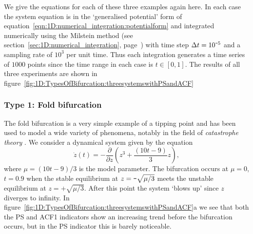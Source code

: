 {{	We give the equations for each of these three examples again here. In each case the system equation is in the `generalised potential' form of equation~\ref{eqn:1D:numerical_integration:potentialform} and integrated numerically using the Milstein method (see section~\ref{sec:1D:numerical_integration}, page~\pageref{sec:1D:numerical_integration}) with time step $\Delta t = 10^{\textup{\texttt{-}} 5}$ and a sampling rate of $10^3$ per unit time. Thus each integration generates a time series of $1000$ points since the time range in each case is $t\in [0,1]$. The results of all three experiments are shown in figure~\ref{fig:1D:TypesOfBifurcation:threesystemswithPSandACF}
	
	\subsubsection{Type 1: Fold bifurcation}
	The fold bifurcation is a very simple example of a tipping point and has been used to model a wide variety of phenomena, notably in the field of \emph{catastrophe theory} \citep{zeeman1977catastrophe, arnold1999bifurcation}. We consider a dynamical system given by the equation
	\begin{equation}
	\label{eqn:1D:TypesOfBifurcation:fold}
		\dot{z}(t) = -\frac{\partial }{\partial z}\left(z^3+\frac{(10t-9)}{3}z\right),
	\end{equation}
	where $\mu = (10t-9)/3$ is the model parameter. The bifurcation occurs at $\mu=0$, $t=0.9$ when the stable equilibrium at $z=\textup{\texttt{-}}\sqrt{\mu/3}$ meets the unstable equilibrium at $z=+\sqrt{\mu/3}$. After this point the system `blows up' since $z$ diverges to infinity. In figure~\ref{fig:1D:TypesOfBifurcation:threesystemswithPSandACF}a we see that both the PS and ACF1 indicators show an increasing trend before the bifurcation occurs, but in the PS indicator this is barely noticeable. 


	
}}
